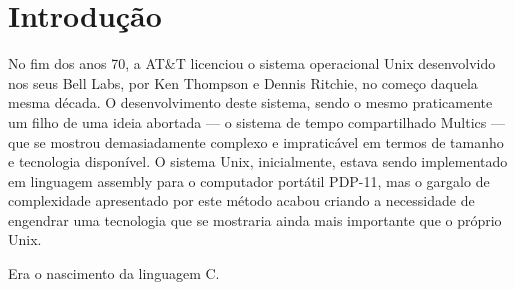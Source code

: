 \documentclass[
	12pt,				%
	openright,			%
	twoside,			%
	a4paper,			%
	english,			%
	french,				%
	spanish,			%
	brazil				%
	]{abntex2}
\begin{document}

\frenchspacing 


\imprimircapa

\imprimirfolhaderosto*

\begin{fichacatalografica}
	\sffamily
	\vspace*{\fill}					%
	\begin{center}					%
	\end{center}
\end{fichacatalografica}

\chapter{Introdução}

No fim dos anos 70, a AT&T licenciou o sistema operacional Unix desenvolvido nos seus Bell Labs, por Ken Thompson e Dennis Ritchie, no começo daquela mesma década. O desenvolvimento deste sistema, sendo o mesmo praticamente um filho de uma ideia abortada --- o sistema de tempo compartilhado Multics --- que se mostrou demasiadamente complexo e impraticável em termos de tamanho e tecnologia disponível. O sistema Unix, inicialmente, estava sendo implementado em linguagem assembly para o computador portátil PDP-11, mas o gargalo de complexidade apresentado por este método acabou criando a necessidade de engendrar uma tecnologia que se mostraria ainda mais importante que o próprio Unix. \par 
Era o nascimento da linguagem C.
\end{document}
